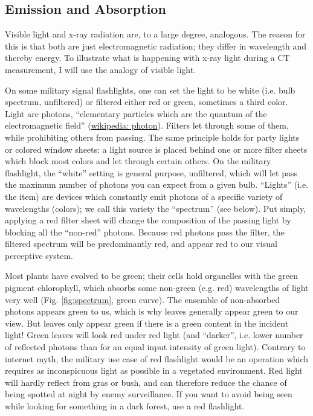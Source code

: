\subsection{Emission and Absorption}
\label{sec:org5d23afb}
Visible light and x-ray radiation are, to a large degree, analogous.
The reason for this is that both are just electromagnetic radiation; they differ in wavelength and thereby energy.
To illustrate what is happening with x-ray light during a CT measurement, I will use the analogy of visible light.


On some military signal flashlights, one can set the light to be white (i.e. bulb spectrum, unfiltered) or filtered either red or green, sometimes a third color.
Light are photons, ``elementary particles which are the quantum of the electromagnetic field'' (\href{https://en.wikipedia.org/wiki/Photon}{wikipedia: photon}).
Filters let through some of them, while prohibiting others from passing.
The same principle holds for party lights or colored window sheets: a light source is placed behind one or more filter sheets which block most colors and let through certain others.
On the military flashlight, the ``white'' setting is general purpose, unfiltered, which will let pass the maximum number of photons you can expect from a given bulb.
``Lights'' (i.e. the item) are devices which constantly emit photons of a specific variety of wavelengths (colors); we call this variety the ``spectrum'' (see below).
Put simply, applying a red filter sheet will change the composition of the passing light by blocking all the ``non-red'' photons.
Because red photons pass the filter, the filtered spectrum will be predominantly red, and appear red to our visual perceptive system.

Most plants have evolved to be green; their cells hold organelles with the green pigment chlorophyll, which absorbs some non-green (e.g. red) wavelengths of light very well (Fig. \ref{fig:spectrum}, green curve).
The ensemble of non-absorbed photons appears green to us, which is why leaves generally appear green to our view.
But leaves only appear green if there is a green content in the incident light!
Green leaves will look red under red light (and ``darker'', i.e. lower number of reflected photons than for an equal input intensity of green light).
Contrary to internet myth, the military use case of red flashlight would be an operation which requires as inconspicuous light as possible in a vegetated environment.
Red light will hardly reflect from gras or bush, and can therefore reduce the chance of being spotted at night by enemy surveillance.
If you want to avoid being seen while looking for something in a dark forest, use a red flashlight.


